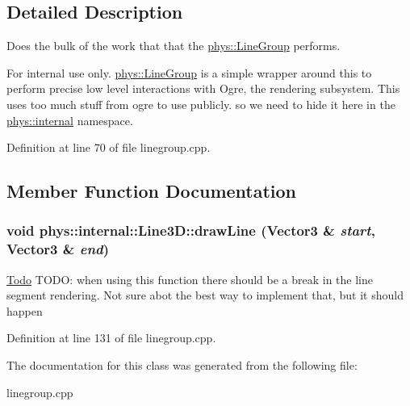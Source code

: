 \subsection{Detailed Description}
Does the bulk of the work that that the \hyperlink{classphys_1_1LineGroup}{phys::LineGroup} performs. \begin{DoxyInternal}{For internal use only.}
\hyperlink{classphys_1_1LineGroup}{phys::LineGroup} is a simple wrapper around this to perform precise low level interactions with Ogre, the rendering subsystem. This uses too much stuff from ogre to use publicly. so we need to hide it here in the \hyperlink{namespacephys_1_1internal}{phys::internal} namespace. \end{DoxyInternal}


Definition at line 70 of file linegroup.cpp.



\subsection{Member Function Documentation}
\hypertarget{classphys_1_1internal_1_1Line3D_a0320e600b9f363036c63eb47527bb854}{
\subsubsection[{drawLine}]{\setlength{\rightskip}{0pt plus 5cm}void phys::internal::Line3D::drawLine (Vector3 \& {\em start}, \/  Vector3 \& {\em end})}}
\label{d4/db5/classphys_1_1internal_1_1Line3D_a0320e600b9f363036c63eb47527bb854}


\begin{Desc}
\item[\hyperlink{todo__todo000008}{Todo}]TODO: when using this function there should be a break in the line segment rendering. Not sure abot the best way to implement that, but it should happen \end{Desc}




Definition at line 131 of file linegroup.cpp.



The documentation for this class was generated from the following file:\begin{DoxyCompactItemize}
\item 
linegroup.cpp\end{DoxyCompactItemize}
